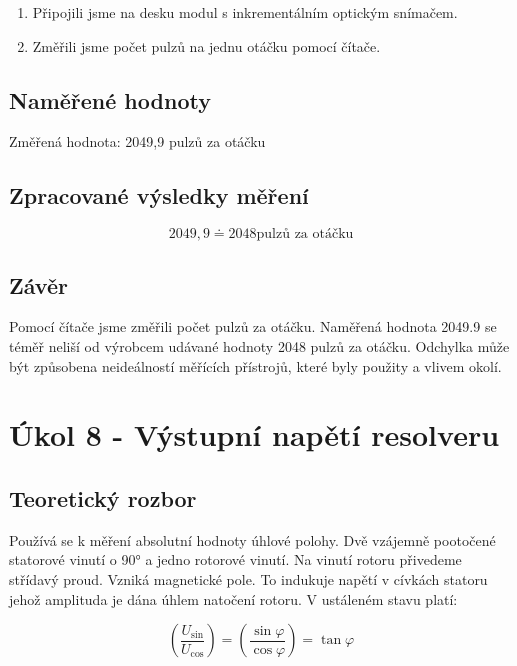 \documentclass{protokol}
\begin{document}
    \begin{enumerate}
        \item Připojili jsme na desku modul s inkrementálním optickým snímačem.
        \item Změřili jsme počet pulzů na jednu otáčku pomocí čítače.
    \end{enumerate}

    \subsection{Naměřené hodnoty}

    \noindent Změřená hodnota: 2049,9 pulzů za otáčku

    \subsection{Zpracované výsledky měření}
        \begin{equation} \label{rov:pythagor}
        2049,9 \doteq 2048 \text{pulzů za otáčku}
    \end{equation} 
            

    \subsection{Závěr}
    \noindent Pomocí čítače jsme změřili počet pulzů za otáčku. Naměřená hodnota 2049.9 se téměř neliší od výrobcem udávané hodnoty 2048 pulzů za otáčku. Odchylka může být způsobena neideálností měřících přístrojů, které byly použity a vlivem okolí.


\pagebreak
\section{Úkol 8 - Výstupní napětí resolveru}
    \subsection{Teoretický rozbor}
    \noindent Používá se k měření absolutní hodnoty úhlové polohy. Dvě vzájemně pootočené statorové vinutí o 90° a jedno rotorové vinutí. Na vinutí rotoru přivedeme střídavý proud. Vzniká magnetické pole. To indukuje napětí v cívkách statoru jehož amplituda je dána úhlem natočení rotoru. V ustáleném stavu platí:

    \begin{equation} \label{rov:pythagor}
        \left( \dfrac{U_{\sin}}{U_{\cos}} \right) = \left(\dfrac{\sin{\varphi}}{\cos{\varphi}} \right) = \tan{\varphi}
    \end{equation} 
\end{document}
